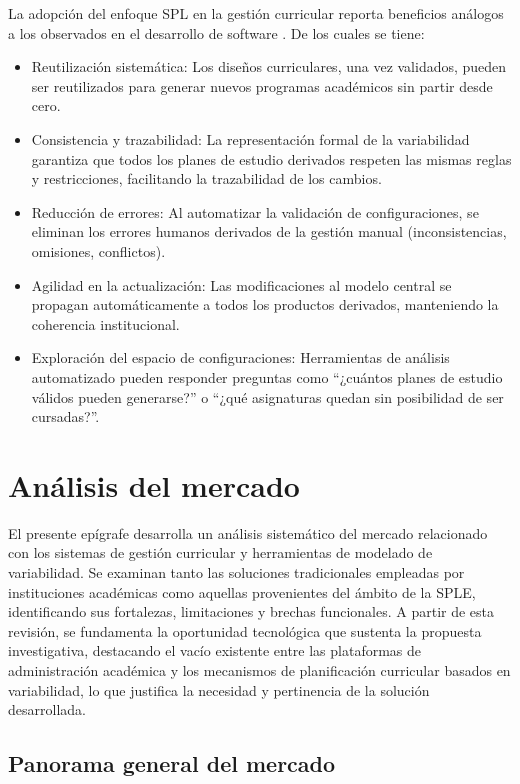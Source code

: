 La adopción del enfoque \ac{SPL} en la gestión curricular reporta beneficios 
análogos a los observados en el desarrollo de software \citep{apel2013feature}. De los cuales
se tiene:

\begin{itemize}
    \item Reutilización sistemática: Los diseños curriculares, una vez validados, pueden ser reutilizados para generar nuevos programas académicos sin partir desde cero.
    \item Consistencia y trazabilidad: La representación formal de la variabilidad garantiza que todos los planes de estudio derivados respeten las mismas reglas y restricciones, facilitando la trazabilidad de los cambios.
    \item Reducción de errores: Al automatizar la validación de configuraciones, se eliminan los errores humanos derivados de la gestión manual (inconsistencias, omisiones, conflictos).
    \item Agilidad en la actualización: Las modificaciones al modelo central se propagan automáticamente a todos los productos derivados, manteniendo la coherencia institucional.
    \item Exploración del espacio de configuraciones: Herramientas de análisis automatizado pueden responder preguntas como ``¿cuántos planes de estudio válidos pueden generarse?'' o ``¿qué asignaturas quedan sin posibilidad de ser cursadas?''.
\end{itemize}


\section{Análisis del mercado}

El presente epígrafe desarrolla un análisis sistemático del mercado 
relacionado con los sistemas de gestión curricular y herramientas
de modelado de variabilidad. Se examinan tanto las soluciones tradicionales 
empleadas por instituciones académicas como aquellas provenientes del 
ámbito de la \ac{SPLE}, identificando
sus fortalezas, limitaciones y brechas funcionales. A partir de esta revisión, 
se fundamenta la oportunidad tecnológica que sustenta la propuesta 
investigativa, destacando el vacío existente entre las plataformas
de administración académica y los mecanismos de planificación curricular 
basados en variabilidad, lo que justifica la necesidad y pertinencia
de la solución desarrollada.

\subsection{Panorama general del mercado}


